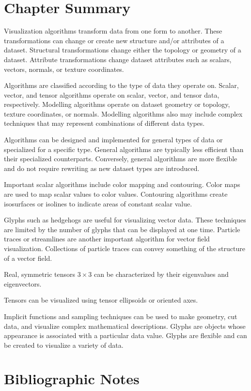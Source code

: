 \section{Chapter Summary}

Visualization algorithms transform data from one form to another. These transformations can change or create new structure and/or attributes of a dataset. Structural transformations change either the topology or geometry of a dataset. Attribute transformations change dataset attributes such as scalars, vectors, normals, or texture coordinates.

Algorithms are classified according to the type of data they operate on. Scalar, vector, and tensor algorithms operate on scalar, vector, and tensor data, respectively. Modelling algorithms operate on dataset geometry or topology, texture coordinates, or normals. Modelling algorithms also may include complex techniques that may represent combinations of different data types.

Algorithms can be designed and implemented for general types of data or specialized for a specific type. General algorithms are typically less efficient than their specialized counterparts. Conversely, general algorithms are more flexible and do not require rewriting as new dataset types are introduced.

Important scalar algorithms include color mapping and contouring. Color maps are used to map scalar values to color values. Contouring algorithms create isosurfaces or isolines to indicate areas of constant scalar value.

Glyphs such as hedgehogs are useful for visualizing vector data. These techniques are limited by the number of glyphs that can be displayed at one time. Particle traces or streamlines are another important algorithm for vector field visualization. Collections of particle traces can convey something of the structure of a vector field.

Real, symmetric tensors $3 \times 3$ can be characterized by their eigenvalues and eigenvectors.

Tensors can be visualized using tensor ellipsoids or oriented axes.

Implicit functions and sampling techniques can be used to make geometry, cut data, and visualize complex mathematical descriptions. Glyphs are objects whose appearance is associated with a particular data value. Glyphs are flexible and can be created to visualize a variety of data.

\section{Bibliographic Notes}

